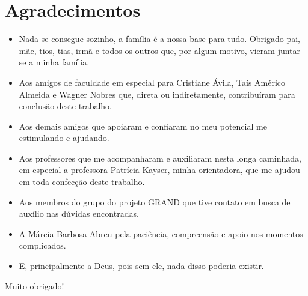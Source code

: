 \chapter*{Agradecimentos}

\begin{itemize}
	\item Nada se consegue sozinho, a família é a nossa base para tudo. Obrigado pai, mãe, tios, tias, irmã e todos os outros que, por algum motivo, vieram juntar-se a minha família.
	\item Aos amigos de faculdade em especial para Cristiane Ávila, Taís Américo Almeida e Wagner Nobres que, direta ou indiretamente, contribuíram para conclusão deste trabalho.
	\item Aos demais amigos que apoiaram e confiaram no meu potencial me estimulando e ajudando.
	\item Aos professores que me acompanharam e auxiliaram nesta longa caminhada, em especial a professora Patrícia Kayser, minha orientadora, que me ajudou em toda confecção deste trabalho.
	\item Aos membros do grupo do projeto GRAND que tive contato em busca de auxílio nas dúvidas encontradas.
	\item A Márcia Barbosa Abreu pela paciência, compreensão e apoio nos momentos complicados.
	\item E, principalmente a Deus, pois sem ele, nada disso poderia existir.
\end{itemize}

Muito obrigado!